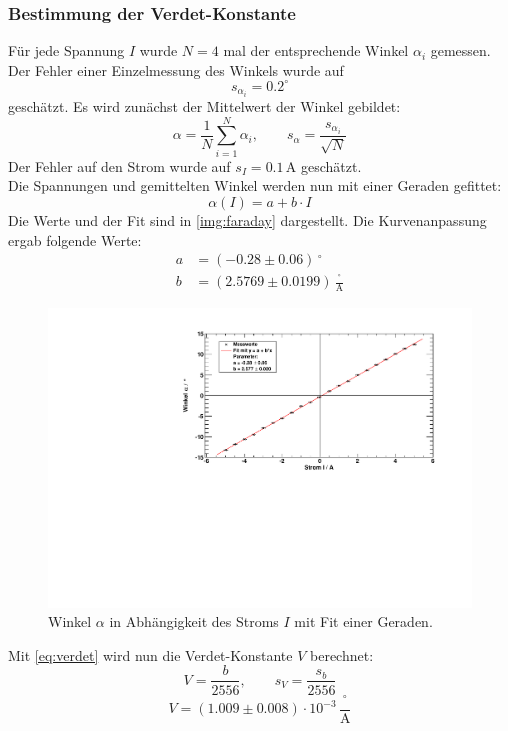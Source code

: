 \subsubsection{Bestimmung der Verdet-Konstante}
Für jede Spannung $I$ wurde $N=4$ mal der entsprechende Winkel $\alpha_i$ gemessen. Der Fehler einer Einzelmessung des Winkels wurde auf
\begin{equation}
  s_{\alpha_i} = 0.2^\circ
\end{equation}  %
geschätzt. Es wird zunächst der Mittelwert der Winkel gebildet:
\begin{equation}
  \alpha = \frac{1}{N} \sum_{i=1}^{N} \alpha_i, \qquad s_{\alpha} = \frac{s_{\alpha_i}}{\sqrt{N}}
\end{equation}
Der Fehler auf den Strom wurde auf $s_I = 0.1$\,A geschätzt.\\
Die Spannungen und gemittelten Winkel werden nun mit einer Geraden gefittet:
\begin{equation}
  \alpha(I) = a + b \cdot I
\end{equation}
Die Werte und der Fit sind in \autoref{img:faraday} dargestellt. Die Kurvenanpassung ergab folgende Werte:
\begin{equation}
\begin{split}
  \label{eq:faraday:params}
  a &= (-0.28 \pm 0.06)\,{}^\circ \\
  b &= (2.5769 \pm 0.0199)\,\frac{{}^\circ}{\text{A}}
\end{split}
\end{equation}
\begin{figure}[H]
\begin{center}
  \includegraphics[width=\textwidth]{../img/faraday.pdf}
  \caption{Winkel $\alpha$ in Abhängigkeit des Stroms $I$ mit Fit einer Geraden.}
  \label{img:faraday}
\end{center}
\end{figure}
Mit \autoref{eq:verdet} wird nun die Verdet-Konstante $V$ berechnet:
\begin{equation}
  \label{eq:eval:verdet}
  V = \frac{b}{2556}, \qquad s_V = \frac{s_b}{2556}
\end{equation}
\begin{equation}
  V = (1.009 \pm 0.008) \cdot 10^{-3}\,\frac{{}^\circ}{\text{A}}
\end{equation}

